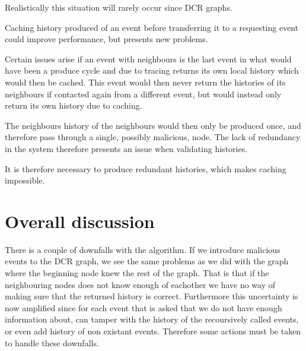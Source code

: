 	Realistically this situation will rarely occur since DCR graphs. 
	
	\newpar Caching history produced of an event before transferring it to a requesting event could improve performance, but presents new problems. 
	
	Certain issues arise if an event with neighbours is the last event in what would have been a produce cycle and due to tracing returns its own local history which would then be cached. This event would then never return the histories of its neighbours if contacted again from a different event, but would instead only return its own history due to caching. 
	
	The neighbours history of the neighbours would then only be produced once, and therefore pass through a single, possibly malicious, node. The lack of redundancy in the system therefore presents an issue when validating histories.  
	
	It is therefore necessary to produce redundant histories, which makes caching impossible.
	
	
	\section{Overall discussion}
	There is a couple of downfalls with the algorithm. If we introduce malicious events to the DCR graph, we see the same problems as we did with the graph where the beginning node knew the rest of the graph. That is that if the neighbouring nodes does not know enough of eachother we have no way of making sure that the returned history is correct. Furthermore this uncertainty is now amplified since for each event that is asked that we do not have enough information about, can tamper with the history of the recoursively called events, or even add history of non existant events. Therefore some actions must be taken to handle these downfalls.
	